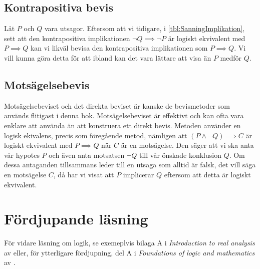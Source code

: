 \subsection{Kontrapositiva bevis}

Låt \(P\) och \(Q\) vara utsagor.
Eftersom att vi tidigare, i \cref{tbl:SanningImplikation}, sett att den
kontrapositiva implikationen \(\lnot Q\implies\lnot 
P\) är logiskt ekvivalent
med \(P\implies Q\) kan vi likväl bevisa den kontrapositiva implikationen som
\(P\implies Q\).
Vi vill kunna göra detta för att ibland kan det vara lättare att visa än \(P\) 
medför \(Q\).

\subsection{Motsägelsebevis}

Motsägelsebeviset och det direkta beviset är kanske de 
bevismetoder som används flitigast i denna bok.
Motsägelsebeviset är effektivt och kan ofta vara enklare att använda än att
konstruera ett direkt bevis.
Metoden använder en logisk ekivalens, precis som föregående metod, nämligen att
\((P\land\lnot Q)\implies C\) är logiskt ekvivalent med \(P\implies Q\) när
\(C\) är en motsägelse.
Den säger att vi ska anta vår hypotes \(P\) och även anta motsatsen
\(\lnot Q\) till vår önskade konklusion \(Q\).
Om dessa antaganden tillsammans leder till en utsaga som alltid är falsk, det
vill säga en motsägelse \(C\), då har vi visat att \(P\) implicerar \(Q\)
eftersom att detta är logiskt ekvivalent.


\section{Fördjupande läsning}

För vidare läsning om logik, se exemeplvis bilaga A i \emph{Introduction to 
real analysis} av \citet{Bartle2000itr} eller, för ytterligare fördjupning, del 
A i \emph{Foundations of logic and mathematics} av 
\citet{nievergelt2002foundations}.

